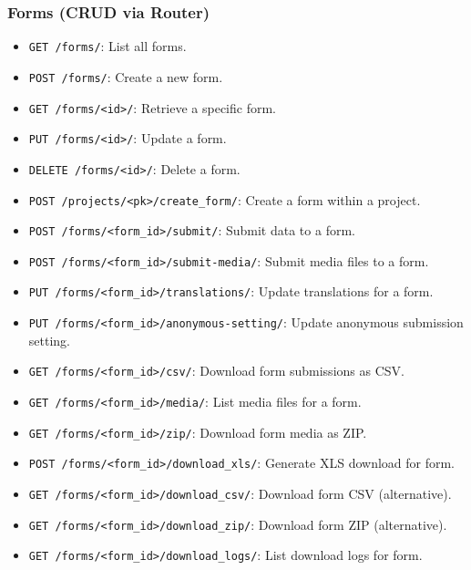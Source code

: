 \documentclass[11pt]{article}
\begin{document}
\subsubsection{Forms (CRUD via Router)}
\begin{itemize}[leftmargin=*]
  \item \verb|GET /forms/|: List all forms.
  \item \verb|POST /forms/|: Create a new form.
  \item \verb|GET /forms/<id>/|: Retrieve a specific form.
  \item \verb|PUT /forms/<id>/|: Update a form.
  \item \verb|DELETE /forms/<id>/|: Delete a form.
  \item \verb|POST /projects/<pk>/create_form/|: Create a form within a project.
  \item \verb|POST /forms/<form_id>/submit/|: Submit data to a form.
  \item \verb|POST /forms/<form_id>/submit-media/|: Submit media files to a form.
  \item \verb|PUT /forms/<form_id>/translations/|: Update translations for a form.
  \item \verb|PUT /forms/<form_id>/anonymous-setting/|: Update anonymous submission setting.
  \item \verb|GET /forms/<form_id>/csv/|: Download form submissions as CSV.
  \item \verb|GET /forms/<form_id>/media/|: List media files for a form.
  \item \verb|GET /forms/<form_id>/zip/|: Download form media as ZIP.
  \item \verb|POST /forms/<form_id>/download_xls/|: Generate XLS download for form.
  \item \verb|GET /forms/<form_id>/download_csv/|: Download form CSV (alternative).
  \item \verb|GET /forms/<form_id>/download_zip/|: Download form ZIP (alternative).
  \item \verb|GET /forms/<form_id>/download_logs/|: List download logs for form.
\end{itemize}
\end{document}
